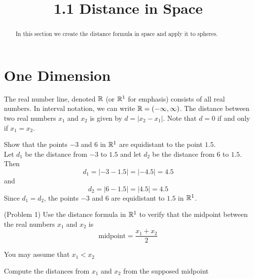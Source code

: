 \documentclass[handout]{ximera}
\title{1.1 Distance in Space}
\begin{document}
\begin{abstract}
In this section we create the distance formula in space and apply it to spheres.
\end{abstract}

\maketitle


\section{One Dimension}

The real number line, denoted $\mathbb R$ (or $\mathbb R^1$ for emphasis) consists of all real numbers.  In interval notation, we can write $\mathbb R = (-\infty, \infty)$.
The distance between two real numbers $x_1$ and $x_2$ is given by $d = |x_2 - x_1|$. Note that $d = 0$ if and only if $x_1 = x_2$.


\begin{center}
\end{center}

\begin{example}[Example 1]
Show that the points $-3$ and $6$ in $\mathbb R^1$ are equidistant to the point $1.5$.\\
Let $d_1$ be the distance from $-3$ to $1.5$ and let $d_2$ be the distance from $6$ to $1.5$. Then
\[
d_1 = |-3 - 1.5| = |-4.5| = 4.5
\]
and
\[
d_2 = |6 - 1.5| = |4.5| = 4.5
\]
Since $d_1 = d_2$, the points $-3$ and $6$ are equidistant to $1.5$ in $\mathbb R^1$.
\end{example}

\begin{problem}(Problem 1)
Use the distance formula in $\mathbb R^1$ to verify that the midpoint between the real numbers $x_1$ and $x_2$ is 
\[
\text{midpoint} = \frac{x_1 +x_2}{2}
\]
\begin{hint}
You may assume that $x_1 < x_2$
\end{hint}

\begin{hint}
Compute the distances from $x_1$ and $x_2$ from the supposed midpoint
\end{hint}
\end{problem}
\end{document}
